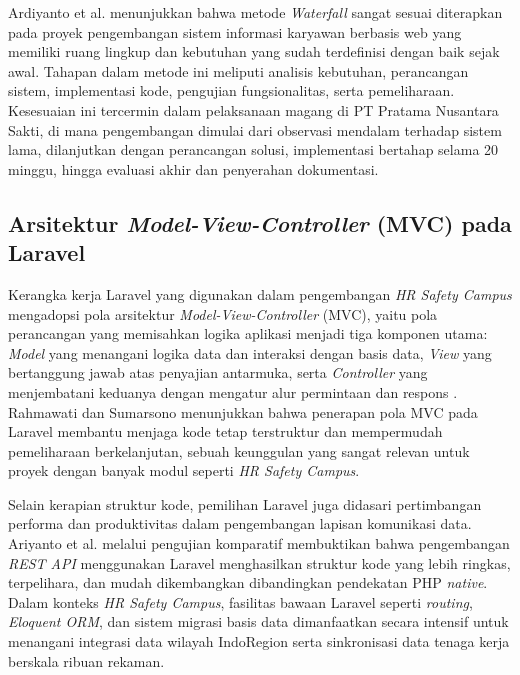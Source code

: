 Ardiyanto et al. \cite{ardiyanto2023waterfall} menunjukkan bahwa metode
\textit{Waterfall} sangat sesuai diterapkan pada proyek pengembangan sistem
informasi karyawan berbasis web yang memiliki ruang lingkup dan kebutuhan yang
sudah terdefinisi dengan baik sejak awal. Tahapan dalam metode ini meliputi
analisis kebutuhan, perancangan sistem, implementasi kode, pengujian
fungsionalitas, serta pemeliharaan. Kesesuaian ini tercermin dalam
pelaksanaan magang di PT Pratama Nusantara Sakti, di mana pengembangan dimulai
dari observasi mendalam terhadap sistem lama, dilanjutkan dengan perancangan
solusi, implementasi bertahap selama 20 minggu, hingga evaluasi akhir dan
penyerahan dokumentasi.
\subsection{Arsitektur \textit{Model-View-Controller} (MVC) pada Laravel}

Kerangka kerja Laravel yang digunakan dalam pengembangan \textit{HR Safety
Campus} mengadopsi pola arsitektur \textit{Model-View-Controller} (MVC), yaitu
pola perancangan yang memisahkan logika aplikasi menjadi tiga komponen utama:
\textit{Model} yang menangani logika data dan interaksi dengan basis data,
\textit{View} yang bertanggung jawab atas penyajian antarmuka, serta
\textit{Controller} yang menjembatani keduanya dengan mengatur alur permintaan
dan respons \cite{rahmawati2024mvc}. Rahmawati dan Sumarsono
\cite{rahmawati2024mvc} menunjukkan bahwa penerapan pola MVC pada Laravel
membantu menjaga kode tetap terstruktur dan mempermudah pemeliharaan
berkelanjutan, sebuah keunggulan yang sangat relevan untuk proyek dengan banyak
modul seperti \textit{HR Safety Campus}.

Selain kerapian struktur kode, pemilihan Laravel juga didasari pertimbangan
performa dan produktivitas dalam pengembangan lapisan komunikasi data. Ariyanto
et al. \cite{ariyanto2024restapi} melalui pengujian komparatif membuktikan
bahwa pengembangan \textit{REST API} menggunakan Laravel menghasilkan struktur
kode yang lebih ringkas, terpelihara, dan mudah dikembangkan dibandingkan
pendekatan PHP \textit{native}. Dalam konteks \textit{HR Safety Campus}, fasilitas
bawaan Laravel seperti \textit{routing}, \textit{Eloquent ORM}, dan sistem migrasi
basis data dimanfaatkan secara intensif untuk menangani integrasi data wilayah
IndoRegion serta sinkronisasi data tenaga kerja berskala ribuan rekaman.
